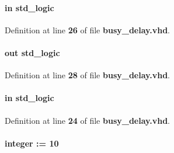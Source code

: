 \paragraph[{busy\+\_\+in}]{ {\bfseries \textcolor{keywordflow}{in}\textcolor{vhdlchar}{ }} {\bfseries \textcolor{comment}{std\+\_\+logic}\textcolor{vhdlchar}{ }} \hspace{0.3cm}{\ttfamily [Port]}}\label{classbusy__delay_acd7c9245187f068564e70696d39ce917}


Definition at line {\bf 26} of file {\bf busy\+\_\+delay.\+vhd}.

\paragraph[{busy\+\_\+out}]{ {\bfseries \textcolor{keywordflow}{out}\textcolor{vhdlchar}{ }} {\bfseries \textcolor{comment}{std\+\_\+logic}\textcolor{vhdlchar}{ }} \hspace{0.3cm}{\ttfamily [Port]}}\label{classbusy__delay_ab5998c5c53b51d0acc6bedaa64b04a94}


Definition at line {\bf 28} of file {\bf busy\+\_\+delay.\+vhd}.

\paragraph[{clk}]{ {\bfseries \textcolor{keywordflow}{in}\textcolor{vhdlchar}{ }} {\bfseries \textcolor{comment}{std\+\_\+logic}\textcolor{vhdlchar}{ }} \hspace{0.3cm}{\ttfamily [Port]}}\label{classbusy__delay_a4a4609c199d30b3adebbeb3a01276ec5}


Definition at line {\bf 24} of file {\bf busy\+\_\+delay.\+vhd}.

\paragraph[{clock\+\_\+period}]{ {\bfseries \textcolor{vhdlchar}{ }} {\bfseries \textcolor{comment}{integer}\textcolor{vhdlchar}{ }\textcolor{vhdlchar}{ }\textcolor{vhdlchar}{\+:}\textcolor{vhdlchar}{=}\textcolor{vhdlchar}{ }\textcolor{vhdlchar}{ } \textcolor{vhdldigit}{10} \textcolor{vhdlchar}{ }} \hspace{0.3cm}{\ttfamily [Generic]}}\label{classbusy__delay_a6cf0679800dde58f7de763f7c8f234a5}


